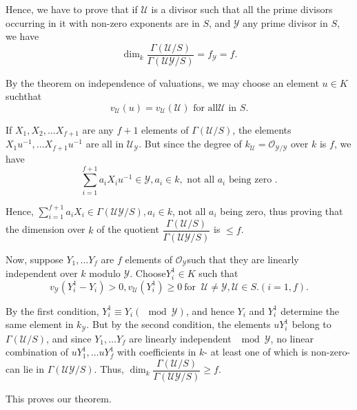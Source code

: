   Hence, we have to prove that if $\mathscr{U}$ is a divisor such that
all the prime divisors occurring in it with non-zero exponents are in
$S$, and $\mathscr{Y}$ any prime divisor in $S$, we have 
$$
\dim_k \frac{\Gamma (\mathscr{U}/S)}{\Gamma
  (\mathscr{U}\mathscr{Y}/S)}= f_\mathscr{Y} = f. 
$$

By the theorem on independence of valuations, we may choose an element
$u \in K$ such\pageoriginale that 
$$
v_\mathscr{U}(u) = v_\mathscr{U}(\mathscr{U}) \text{ for all
}\mathscr{U} \text{ in } S. 
$$

If $X_1, X_2, \ldots X_{f+1}$ are any $f+1$ elements of $\Gamma
(\mathscr{U} /S)$, the elements $X_1 u^{-1}, \ldots X_{f+1}u^{-1}$ are
all in $\mathscr{U}_\mathscr{Y}$. But since the degree of
$k_\mathscr{U} = \mathscr{O}_{\mathscr{Y}/\mathscr{Y}}$ over $k$ is
$f$, we have 
$$
\sum^{f+1}_{i=1} a_i X_i u^{-1} \in \mathscr{Y}, a_i \in k, \text{ not
  all } a_i \text{ being zero }. 
$$

Hence, $\sum \limits^{f+1}_{i=1} a_i X_i \in \Gamma (\mathscr{U}
\mathscr{Y}/S), a_i \in k$, not all $a_i$ being zero, thus proving
that the dimension over $k$ of the quotient $\dfrac{\Gamma
  (\mathscr{U}/S)}{\Gamma (\mathscr{U}\mathscr{Y}/S)}$ is $\leq f$. 

Now, suppose $Y_1, \ldots Y_f$ are $f$ elements of
$\mathscr{O}_{\mathscr{Y}}$such that they are linearly independent
over $k$ modulo $\mathscr{Y}$. Choose$Y^1_i \in K$ such that  
$$
v_{\mathscr{Y}}(Y^1_i -Y_i) > 0, v_{\mathscr{U}}(Y^1_i) \geq 0 ~\text{
  for }~ \mathscr{U} \neq \mathscr{Y}, \mathscr{U} \in S. (i =1, f). 
$$

By the first condition, $Y^1_i \equiv Y_i (\mod \mathscr{Y})$, and
hence $Y_i$ and $Y^1_i$ determine the same element in
$k_\mathscr{Y}$. But by the second condition, the elements $u Y^1_i$
belong to $\Gamma(\mathscr{U}/S)$, and since $Y_1, \ldots Y_f$ are
linearly independent $\mod \mathscr{Y}$, no linear combination of $u
Y^1_1, \ldots uY^1_f$ with coefficients in $k$- at least one of which
is non-zero-can lie in $\Gamma(\mathscr{U} \mathscr{Y}/S)$. Thus,
$\dim_k \dfrac{\Gamma
  (\mathscr{U}/S)}{\Gamma(\mathscr{U}\mathscr{Y}/S)} \geq f$. 

\medskip
\noindent
This proves our theorem.
